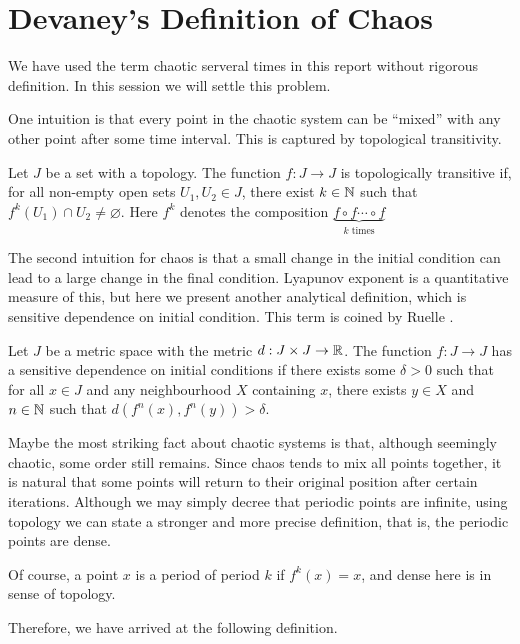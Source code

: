 \section{Devaney's Definition of Chaos}

We have used the term chaotic serveral times in this report without rigorous definition. 
In this session we will settle this problem.

One intuition is that every point in the chaotic system can be ``mixed'' with any other point after some time interval. 
This is captured by topological transitivity.
\begin{defn}
	Let $J$ be a set with a topology.
	The function $f: J \rightarrow J$ is topologically transitive if, for all non-empty open sets $U_1, U_2 \in J$, there exist $k \in \mathbb{N}$ such that $f^k(U_1) \cap U_2 \neq \varnothing$. 
	Here $f^k$ denotes the composition $\underbrace{f \circ f \cdots \circ f}_{k \text{ times}}$
\end{defn}

The second intuition for chaos is that a small change in the initial condition can lead to a large change in the final condition. 
Lyapunov exponent is a quantitative measure of this, but here we present another analytical definition, which is sensitive dependence on initial condition. This term is coined by Ruelle \cite{Ruelle-1978}.
\begin{defn}
	Let $J$ be a metric space with the metric $d: J \times J \rightarrow \mathbb{R}$. The function
	$f: J \rightarrow J$ has a sensitive dependence on initial conditions if there exists some $\delta > 0$ such that for all $x \in J$ and any neighbourhood $X$ containing $x$, there exists $y \in X$ and $n \in \mathbb{N}$ such that $d(f^n(x), f^n(y)) > \delta$.
\end{defn}

Maybe the most striking fact about chaotic systems is that, although seemingly chaotic, some order still remains.
Since chaos tends to mix all points together, it is natural that some points will return to their original position after certain iterations.
Although we may simply decree that periodic points are infinite, using topology we can state a stronger and more precise definition, that is, the periodic points are dense.

Of course, a point $x$ is a period of period $k$ if $f^k(x)=x$, and dense here is in sense of topology.

Therefore, we have arrived at the following definition.

